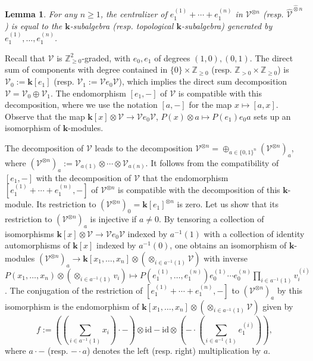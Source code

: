 \documentclass[10pt]{amsart}
\newtheorem{lem}[thm]{Lemma}
\numberwithin{equation}{subsection}
\begin{document}
\begin{lem}\label{lemma:comm:0304:BIS}
For any $n\geq 1$, the centralizer of $e_1^{(1)}+\cdots+e_1^{(n)}$ in $\mathcal V^{\otimes n}$ (resp. $\hat{\mathcal V}^{\hat\otimes n}$) 
is equal to the $\mathbf k$-subalgebra (resp. topological $\mathbf k$-subalgebra) generated by $e_1^{(1)},\ldots,e_1^{(n)}$.   
\end{lem}

\proof 
Recall that $\mathcal V$ is $\mathbb Z_{\geq 0}^2$-graded, with $e_0,e_1$ of degrees $(1,0),(0,1)$. 
The direct sum of components with degree contained in 
$\{0\}\times\mathbb Z_{\geq 0}$ (resp. $\mathbb Z_{>0}\times\mathbb Z_{\geq 0}$) is $\mathcal V_0:=\mathbf k[e_1]$ 
(resp. $\mathcal V_1:=\mathcal Ve_0\mathcal V$), which implies the direct sum decomposition $\mathcal V=
\mathcal V_0\oplus\mathcal V_1$. The endomorphism $[e_1,-]$ of $\mathcal V$ is compatible with this decomposition, where we use the 
notation $[a,-]$ for the map $x\mapsto[a,x]$. Observe that the map $\mathbf k[x]\otimes\mathcal V\to \mathcal Ve_0\mathcal V$, 
$P(x)\otimes a\mapsto P(e_1)e_0a$ sets up an isomorphism of $\mathbf k$-modules. 

The decomposition of $\mathcal V$ leads to 
the decomposition $\mathcal V^{\otimes n}=\oplus_{a\in\{0,1\}^n}(\mathcal V^{\otimes n})_a$, where 
$(\mathcal V^{\otimes n})_a:=\mathcal V_{a(1)}\otimes\cdots\otimes \mathcal V_{a(n)}$. It follows from the compatibility of 
$[e_1,-]$ with the decomposition of $\mathcal V$ that the endomorphism 
$[e_1^{(1)}+\cdots+e_1^{(n)},-]$ of $\mathcal V^{\otimes n}$ is compatible with the decomposition of this $\mathbf k$-module. 
Its restriction to $(\mathcal V^{\otimes n})_0=\mathbf k[e_1]^{\otimes n}$ is zero. Let us show that its restriction to
$(\mathcal V^{\otimes n})_a$ is injective if $a\neq 0$. By tensoring a collection of 
isomorphisms $\mathbf k[x]\otimes\mathcal V\to \mathcal Ve_0\mathcal V$ indexed by 
$a^{-1}(1)$ with a collection of identity automorphisms of $\mathbf k[x]$ indexed by 
$a^{-1}(0)$, one obtains an isomorphism of $\mathbf k$-modules
$(\mathcal V^{\otimes n})_a\to\mathbf k[x_1,\ldots,x_n]\otimes(\otimes_{i\in a^{-1}(1)}\mathcal V)$ with inverse 
$P(x_1,\ldots,x_n)\otimes (\otimes_{i\in a^{-1}(1)}v_i)\mapsto 
P(e_1^{(1)},\ldots,e_1^{(n)})e_0^{(1)}\cdots e_0^{(n)}\prod_{i\in a^{-1}(1)}v_i^{(i)}$. 
The conjugation of the restriction of  $[e_1^{(1)}+\cdots+e_1^{(n)},-]$ to $(\mathcal V^{\otimes n})_a$ by this isomorphism
is the endomorphism of $\mathbf k[x_1,\ldots,x_n]\otimes(\otimes_{i\in a^{-1}(1)}\mathcal V)$ given by  
\begin{equation}\label{transport:endo:BIS}
f:=((\sum_{i\in a^{-1}(1)}x_i)\cdot-)\otimes\mathrm{id}-\mathrm{id}\otimes(-\cdot (\sum_{i\in a^{-1}(1)}e_1^{(i)})),
\end{equation} 
where $a\cdot -$ (resp. $-\cdot a$) denotes the left (resp. right) multiplication by $a$. 
\end{document}
